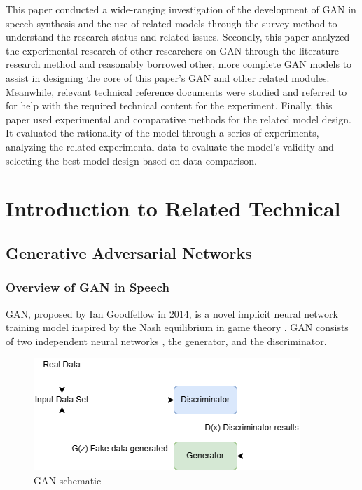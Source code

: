 \documentclass[10pt,journal,compsoc]{IEEEtran}
\begin{document}
This paper conducted a wide-ranging investigation of the development of GAN in speech synthesis and the use of related models through the survey method to understand the research status and related issues. Secondly, this paper analyzed the experimental research of other researchers on GAN through the literature research method and reasonably borrowed other, more complete GAN models to assist in designing the core of this paper's GAN and other related modules. Meanwhile, relevant technical reference documents were studied and referred to for help with the required technical content for the experiment. Finally, this paper used experimental and comparative methods for the related model design. It evaluated the rationality of the model through a series of experiments, analyzing the related experimental data to evaluate the model's validity and selecting the best model design based on data comparison.

\section{Introduction to Related Technical}

\subsection{Generative Adversarial Networks}

\subsubsection{Overview of GAN in Speech}

GAN, proposed by Ian Goodfellow in 2014, is a novel implicit neural network training model inspired by the Nash equilibrium in game theory \cite{5}. GAN consists of two independent neural networks \cite{6}, the generator, and the discriminator.

\begin{figure}
    \centering
    \includegraphics[scale=0.6] {PNG/2-1.png}
    \caption{GAN schematic}
    \label{fig:2-1}
\end{figure}
\end{document}
